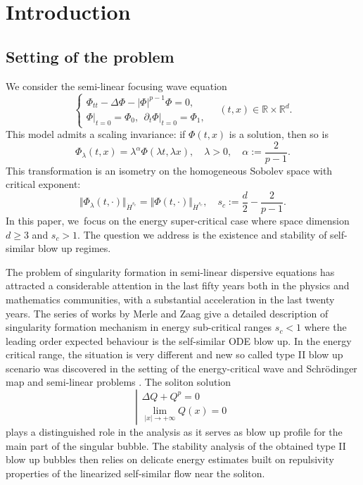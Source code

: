 \documentclass[JEP,XML,SOM,Unicode]{cedram}
\theoremstyle{plain}
\theoremstyle{definition}
\begin{document}
\section{Introduction}

\subsection{Setting of the problem} We consider the semi-linear focusing wave equation
\begin{equation}
\label{eq: Nonlinear Wave}
\begin{cases}\Phi_{tt}-\Delta\Phi-|\Phi|^{p-1}\Phi=0,\\
\Phi\big|_{t=0}=\Phi_0,\ \ \partial_t\Phi\big|_{t=0}=\Phi_1,\end{cases}
\quad (t,x) \in \mathbb R\times \mathbb R^d.
\end{equation}
This model admits a scaling invariance: if $\Phi(t,x)$ is a solution, then so is
\[
\Phi_\lambda(t,x)=\lambda^\alpha \Phi(\lambda t,\lambda x),\quad \lambda>0,\quad \alpha:=\frac{2}{p-1}.
\]
This transformation is an isometry on the homogeneous Sobolev space with critical exponent:
\begin{equation}
\label{eq: Critical Scaling}
\Vert \Phi_\lambda(t,\cdot)\Vert_{\dot H^{s_c}}=\Vert \Phi(t,\cdot)\Vert_{\dot H^{s_c}},\quad s_c:=\frac{d}{2}-\frac{2}{p-1}.
\end{equation}
In this paper, we~focus on the energy super-critical case where space dimension $d\ge 3$ and $s_c>1$. The question we address is the existence and stability of self-similar blow up regimes.

The problem of singularity formation in semi-linear dispersive equations has attracted a considerable attention in the last fifty years both in the physics and mathematics communities, with a substantial acceleration in the last twenty years. The series of works by Merle and Zaag \cite{MZ1,MZ2, MZ3, MZ4} give a detailed description of singularity formation mechanism in energy sub-critical ranges $s_c<1$ where the leading order expected behaviour is the self-similar ODE blow up. In the energy critical range, the situation is very different and new so called type II blow up scenario was discovered in the setting of the energy-critical wave and Schrödinger map \cite{KST, RodSter, RaphRod, MRRsch} and semi-linear problems \cite{HR}. The soliton solution
\[
\left|\begin{array}{l}
\Delta Q+Q^p=0\\
\lim_{|x|\to +\infty} Q(x)=0
\end{array}\right.
\]
plays a distinguished role in the analysis as it serves as blow up profile for the main part of the singular bubble. The stability analysis of the obtained type II blow up bubbles then relies on delicate energy estimates built on repulsivity properties of the linearized self-similar flow near the soliton.
\end{document}
